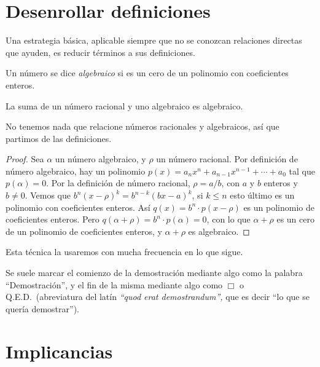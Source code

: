 \section{Desenrollar definiciones}
\label{sec:desenrollar-definciones}

  Una estrategia básica,
  aplicable siempre que no se conozcan relaciones directas
  que ayuden,
  es reducir términos a sus definiciones.

  \begin{definition}
    Un número se dice \emph{algebraico}%
    si es un cero de un polinomio con coeficientes enteros.
  \end{definition}

  \begin{proposition}
    \label{prop:racional+algebraico}
    La suma de un número racional y uno algebraico
    es algebraico.
  \end{proposition}
  No tenemos nada que relacione números racionales y algebraicos,
  así que partimos de las definiciones.
  \begin{proof}
    Sea \(\alpha\) un número algebraico,
    y \(\rho\) un número racional.
    Por definición de número algebraico,
    hay un polinomio
      \(p(x) = a_n x^n + a_{n - 1} x^{n - 1} + \dotsb + a_0\)
    tal que \(p(\alpha) = 0\).
    Por la definición de número racional,%
    \(\rho = a / b\),
    con \(a\) y \(b\) enteros
    y \(b \ne 0\).
    Vemos que \(b^n (x - \rho)^k = b^{n - k} (b x - a)^k\),
    si \(k \le n\)
    esto último es un polinomio con coeficientes enteros.
    Así \(q(x) = b^n \cdot p(x - \rho)\) es un polinomio
    de coeficientes enteros.
    Pero \(q(\alpha + \rho) = b^n \cdot p(\alpha) = 0\),
    con lo que \(\alpha + \rho\) es un cero de un polinomio
    de coeficientes enteros,
    y \(\alpha + \rho\) es algebraico.
  \end{proof}
  Esta técnica la usaremos con mucha frecuencia en lo que sigue.

  Se suele marcar el comienzo de la demostración
  mediante algo como la palabra ``Demostración'',
  y el fin de la misma mediante algo como \(\Box\)
  o Q.E.D.\
  (abreviatura del latín
   \emph{``\foreignlanguage{latin}{quod erat demostrandum}'',}
   que es decir ``lo que se quería demostrar'').

\section{Implicancias}
\label{sec:implicancias}

